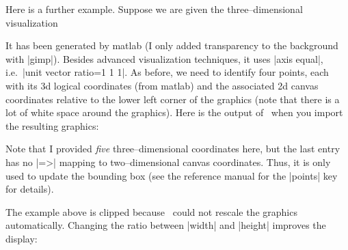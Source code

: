{{Here is a further example. Suppose we are given the three--dimensional visualization

{\setlength{\fboxsep}{0pt}%
\centering
{}%

}%

It has been generated by matlab (I only added transparency to the background with |gimp|). Besides advanced visualization techniques, it uses |axis equal|, i.e.\ |unit vector ratio=1 1 1|. As before, we need to identify four points, each with its 3d logical coordinates (from matlab) and the associated 2d canvas coordinates relative to the lower left corner of the graphics (note that there is a lot of white space around the graphics). Here is the output of \PGFPlots\ when you import the resulting graphics:

\begin{codeexample}[]
\end{codeexample}
\noindent Note that I provided \emph{five} three--dimensional coordinates here, but the last entry has no |=>| mapping to two--dimensional canvas coordinates. Thus, it is only used to update the bounding box (see the reference manual for the |points| key for details).

The example above is clipped because \PGFPlots\ could not rescale the graphics automatically. Changing the ratio between |width| and |height| improves the display:

}}
